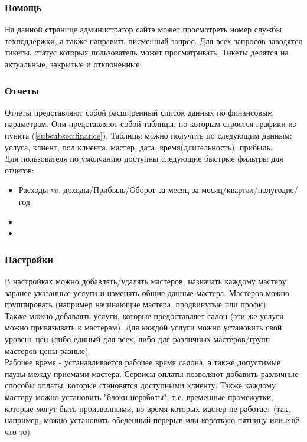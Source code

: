 \documentclass[DIV=calc, paper=a4, fontsize=11pt]{scrartcl} %
\begin{document}
\subsubsection{Помощь}
На данной странице администратор сайта может просмотреть номер службы техподдержки, а также направить писменный запрос. Для всех запросов заводятся тикеты, статус которых пользователь может просматривать. Тикеты делятся на актуальные, закрытые и отклоненные.

\subsubsection{Отчеты}
Отчеты представляют собой расширенный список данных по финансовым параметрам. Они представляют собой таблицы, по которым строятся графики из пункта (\ref{subsubsec:finance}). Таблицы можно получить по следующим данным: услуга, клиент, пол клиента, мастер, дата, время(длительность), прибыль. 
\\[0.5cm]
Для пользователя по умолчанию доступны следующие быстрые фильтры для отчетов: 
    \begin{itemize}
        \item Расходы vs. доходы/Прибыль/Оборот за месяц за месяц/квартал/полугодие/год
        \item 
        \item 
    \end{itemize}


\subsubsection{Настройки}
В настройках можно добавлять/удалять мастеров, назначать каждому мастеру заранее указанные услуги и изменять общие данные мастера. Мастеров можно группировать (например начинающие мастера, продвинутые или профи)
\\[0.5cm]
Также можно добавлять услуги, которые предоставляет салон (эти же услуги можно привязывать к мастерам). Для каждой услуги можно установить свой уровень цен (либо единый для всех, либо для различных мастеров/групп мастеров цены разные)
\\[0.5cm]
Рабочее время - устанавливается рабочее время салона, а также допустимые паузы между приемами мастера.
Сервисы оплаты позволяют добавить различные способы оплаты, которые становятся доступными клиенту. Также каждому мастеру можно установить "блоки неработы", т.е. временные промежутки, которые могут быть произволными, во время которых мастер не работает (так, например, можно установить обеденный перерыв или короткую пятницу или ещё что-то)
\end{document}
